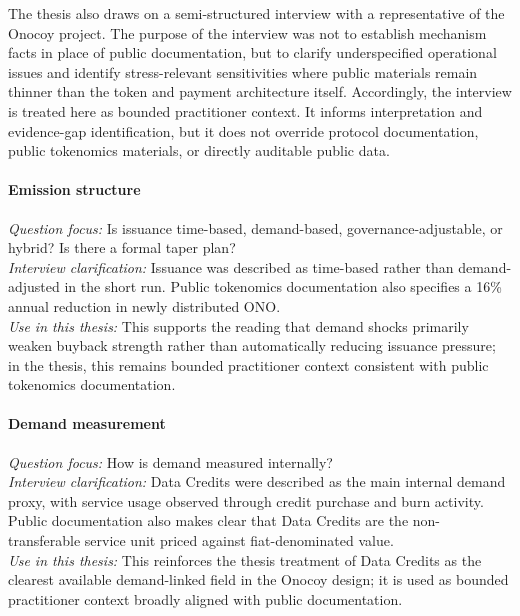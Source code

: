 The thesis also draws on a semi-structured interview with a representative of the Onocoy project. The purpose of the interview was not to establish mechanism facts in place of public documentation, but to clarify underspecified operational issues and identify stress-relevant sensitivities where public materials remain thinner than the token and payment architecture itself. Accordingly, the interview is treated here as bounded practitioner context. It informs interpretation and evidence-gap identification, but it does not override protocol documentation, public tokenomics materials, or directly auditable public data.

\paragraph{Emission structure}
\emph{Question focus:} Is issuance time-based, demand-based, governance-adjustable, or hybrid? Is there a formal taper plan? \\
\emph{Interview clarification:} Issuance was described as time-based rather than demand-adjusted in the short run. Public tokenomics documentation also specifies a 16\% annual reduction in newly distributed ONO. \\
\emph{Use in this thesis:} This supports the reading that demand shocks primarily weaken buyback strength rather than automatically reducing issuance pressure; in the thesis, this remains bounded practitioner context consistent with public tokenomics documentation.

\paragraph{Demand measurement}
\emph{Question focus:} How is demand measured internally? \\
\emph{Interview clarification:} Data Credits were described as the main internal demand proxy, with service usage observed through credit purchase and burn activity. Public documentation also makes clear that Data Credits are the non-transferable service unit priced against fiat-denominated value. \\
\emph{Use in this thesis:} This reinforces the thesis treatment of Data Credits as the clearest available demand-linked field in the Onocoy design; it is used as bounded practitioner context broadly aligned with public documentation.

